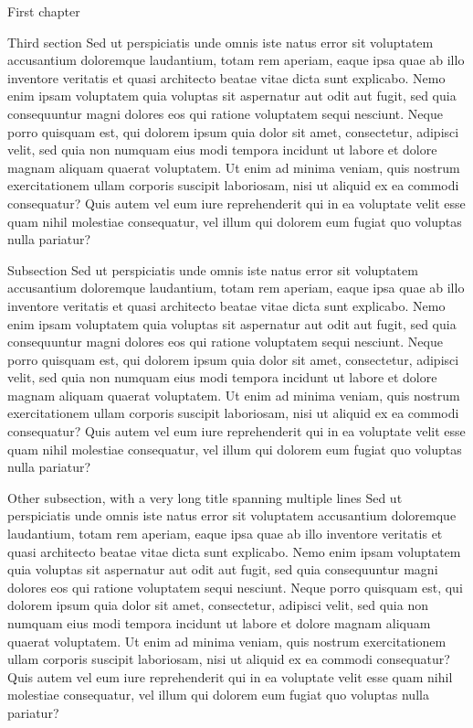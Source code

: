 \documentclass[french, english]{mythesis}
\begin{document}
\begin{mychapter}{First chapter}
	\begin{mysection}{Third section}
Sed ut perspiciatis unde omnis iste natus error sit voluptatem accusantium doloremque laudantium, totam rem aperiam, eaque ipsa quae ab illo inventore veritatis et quasi architecto beatae vitae dicta sunt explicabo. Nemo enim ipsam voluptatem quia voluptas sit aspernatur aut odit aut fugit, sed quia consequuntur magni dolores eos qui ratione voluptatem sequi nesciunt. Neque porro quisquam est, qui dolorem ipsum quia dolor sit amet, consectetur, adipisci velit, sed quia non numquam eius modi tempora incidunt ut labore et dolore magnam aliquam quaerat voluptatem. Ut enim ad minima veniam, quis nostrum exercitationem ullam corporis suscipit laboriosam, nisi ut aliquid ex ea commodi consequatur? Quis autem vel eum iure reprehenderit qui in ea voluptate velit esse quam nihil molestiae consequatur, vel illum qui dolorem eum fugiat quo voluptas nulla pariatur?
	\begin{mysubsection}{Subsection}
	Sed ut perspiciatis unde omnis iste natus error sit voluptatem accusantium doloremque laudantium, totam rem aperiam, eaque ipsa quae ab illo inventore veritatis et quasi architecto beatae vitae dicta sunt explicabo. Nemo enim ipsam voluptatem quia voluptas sit aspernatur aut odit aut fugit, sed quia consequuntur magni dolores eos qui ratione voluptatem sequi nesciunt. Neque porro quisquam est, qui dolorem ipsum quia dolor sit amet, consectetur, adipisci velit, sed quia non numquam eius modi tempora incidunt ut labore et dolore magnam aliquam quaerat voluptatem. Ut enim ad minima veniam, quis nostrum exercitationem ullam corporis suscipit laboriosam, nisi ut aliquid ex ea commodi consequatur? Quis autem vel eum iure reprehenderit qui in ea voluptate velit esse quam nihil molestiae consequatur, vel illum qui dolorem eum fugiat quo voluptas nulla pariatur?
	\end{mysubsection}
	\begin{mysubsection}{Other subsection, with a very long title spanning multiple lines}
	Sed ut perspiciatis unde omnis iste natus error sit voluptatem accusantium doloremque laudantium, totam rem aperiam, eaque ipsa quae ab illo inventore veritatis et quasi architecto beatae vitae dicta sunt explicabo. Nemo enim ipsam voluptatem quia voluptas sit aspernatur aut odit aut fugit, sed quia consequuntur magni dolores eos qui ratione voluptatem sequi nesciunt. Neque porro quisquam est, qui dolorem ipsum quia dolor sit amet, consectetur, adipisci velit, sed quia non numquam eius modi tempora incidunt ut labore et dolore magnam aliquam quaerat voluptatem. Ut enim ad minima veniam, quis nostrum exercitationem ullam corporis suscipit laboriosam, nisi ut aliquid ex ea commodi consequatur? Quis autem vel eum iure reprehenderit qui in ea voluptate velit esse quam nihil molestiae consequatur, vel illum qui dolorem eum fugiat quo voluptas nulla pariatur?
	\end{mysubsection}
	\end{mysection}
	\end{mychapter}
	
\end{document}

